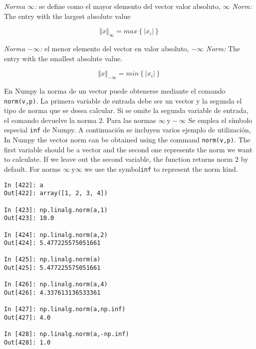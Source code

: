 \begin{paracol}{2}
\emph{Norma $\infty$:} se define como el mayor elemento del vector valor absoluto,
\switchcolumn
\emph{$\infty$ Norm:} The entry with the largest absolute value
\end{paracol}

\begin{equation*}
\Vert x \Vert_\infty =max \left\lbrace \vert x_i\vert\right \rbrace 
\end{equation*}

\begin{paracol}{2}
\emph{Norma $-\infty$:} el menor elemento del vector en valor absoluto,
\switchcolumn
\emph{$-\infty$ Norm:} The entry with the smallest absolute value. 
\end{paracol}
\begin{equation*}
\Vert x \Vert_{-\infty} =min \left\lbrace \vert x_i\vert\right \rbrace 
\end{equation*}
\begin{paracol}{2}
En Numpy la norma de un vector puede obtenerse mediante el comando \texttt{norm(v,p)}. La primera variable de entrada debe ser un vector y la segunda el tipo de norma que se desea calcular. Si se omite la segunda variable de entrada, el comando devuelve la norma 2. Para las normas $\infty\ \text{y} -\infty$ Se emplea el símbolo especial \texttt{inf} de Numpy. A continuación se incluyen varios ejemplo de utilización,
\switchcolumn
In Numpy the vector norm can be obtained using the command \texttt{norm(v,p)}. The first variable should be a vector and the second one represents the norm we want to calculate. If we leave out the second variable, the function returns norm 2 by default. For norms $\infty\ \text{y} \infty$ we use the symbol\texttt{inf} to represent the norm kind.
\end{paracol}

\begin{center}
    \begin{minipage}{.5\textwidth}
        \begin{verbatim}
In [422]: a
Out[422]: array([1, 2, 3, 4])

In [423]: np.linalg.norm(a,1)
Out[423]: 10.0

In [424]: np.linalg.norm(a,2)
Out[424]: 5.477225575051661

In [425]: np.linalg.norm(a)
Out[425]: 5.477225575051661

In [426]: np.linalg.norm(a,4)
Out[426]: 4.337613136533361

In [427]: np.linalg.norm(a,np.inf)
Out[427]: 4.0

In [428]: np.linalg.norm(a,-np.inf)
Out[428]: 1.0
        \end{verbatim}
    \end{minipage}
\end{center}

